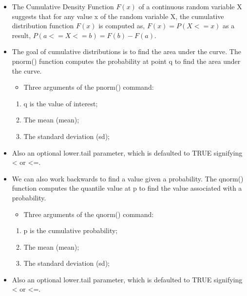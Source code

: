 \documentclass[
  letterpaper,
  DIV=11,
  numbers=noendperiod]{scrreprt}
\providecommand{\tightlist}{%
  \setlength{\itemsep}{0pt}\setlength{\parskip}{0pt}}\usepackage{longtable,booktabs,array}
\begin{document}
\begin{itemize}
\item
  The Cumulative Density Function \(F(x)\) of a continuous random
  variable X suggests that for any value x of the random variable X, the
  cumulative distribution function \(F(x)\) is computed as,
  \(F(x) = P(X <= x)\) as a result, \(P(a<=X<=b) = F(b)- F(a)\).
\item
  The goal of cumulative distributions is to find the area under the
  curve. The pnorm() function computes the probability at point q to
  find the area under the curve.

  \begin{itemize}
  \tightlist
  \item
    Three arguments of the pnorm() command:
  \end{itemize}

  \begin{enumerate}
  \def\labelenumi{\arabic{enumi}.}
  \tightlist
  \item
    q is the value of interest;
  \item
    The mean (mean);
  \item
    The standard deviation (sd);
  \end{enumerate}
\item
  Also an optional lower.tail parameter, which is defaulted to TRUE
  signifying \textless{} or \textless=.
\item
  We can also work backwards to find a value given a probability. The
  qnorm() function computes the quantile value at p to find the value
  associated with a probability.

  \begin{itemize}
  \tightlist
  \item
    Three arguments of the qnorm() command:
  \end{itemize}

  \begin{enumerate}
  \def\labelenumi{\arabic{enumi}.}
  \tightlist
  \item
    p is the cumulative probability;
  \item
    The mean (mean);
  \item
    The standard deviation (sd);
  \end{enumerate}
\item
  Also an optional lower.tail parameter, which is defaulted to TRUE
  signifying \textless{} or \textless=.
\end{itemize}
\end{document}
